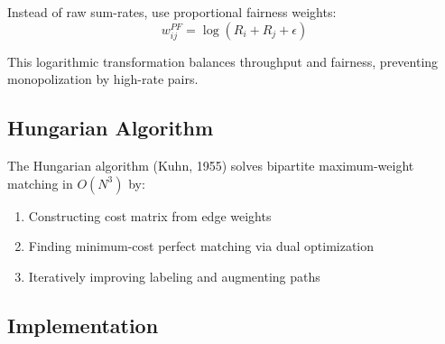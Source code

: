 Instead of raw sum-rates, use proportional fairness weights:
\begin{equation}
w_{ij}^{PF} = \log(R_i + R_j + \epsilon)
\end{equation}

This logarithmic transformation balances throughput and fairness, preventing monopolization by high-rate pairs.

\subsection{Hungarian Algorithm}

The Hungarian algorithm (Kuhn, 1955) solves bipartite maximum-weight matching in $O(N^3)$ by:

\begin{enumerate}
    \item Constructing cost matrix from edge weights
    \item Finding minimum-cost perfect matching via dual optimization
    \item Iteratively improving labeling and augmenting paths
\end{enumerate}

\subsection{Implementation}

